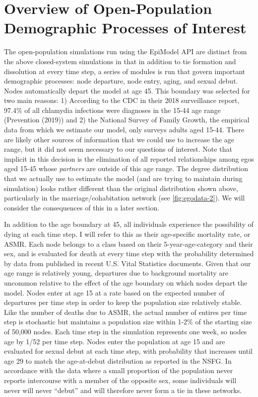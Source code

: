\documentclass [11pt, proquest] {uwthesis}[2015/03/03]
\begin{document}
\hypertarget{overview-of-open-population-demographic-processes-of-interest}{%
\section{Overview of Open-Population Demographic Processes of Interest}\label{overview-of-open-population-demographic-processes-of-interest}}

The open-population simulations run using the EpiModel API are distinct from the above closed-system simulations in that in addition to tie formation and dissolution at every time step, a series of modules is run that govern important demographic processes: node departure, node entry, aging, and sexual debut. Nodes automatically depart the model at age 45. This boundary was selected for two main reasons: 1) According to the CDC in their 2018 surveillance report, 97.4\% of all chlamydia infections were diagnoses in the 15-44 age range (Prevention (2019)) and 2) the National Survey of Family Growth, the empirical data from which we estimate our model, only surveys adults aged 15-44. There are likely other sources of information that we could use to increase the age range, but it did not seem necessary to our questions of interest. Note that implicit in this decision is the elimination of all reported relationships among egos aged 15-45 whose \emph{partners} are outside of this age range. The degree distribution that we actually use to estimate the model (and are trying to maintain during simulation) looks rather different than the original distribution shown above, particularly in the marriage/cohabitation network (see \ref{fig:egodata-2}). We will consider the consequences of this in a later section.

In addition to the age boundary at 45, all individuals experience the possibility of dying at each time step. I will refer to this as their age-specific mortality rate, or ASMR. Each node belongs to a class based on their 5-year-age-category and their sex, and is evaluated for death at every time step with the probability determined by data from published in recent U.S. Vital Statistics documents. Given that our age range is relatively young, departures due to background mortality are uncommon relative to the effect of the age boundary on which nodes depart the model. Nodes enter at age 15 at a rate based on the expected number of departures per time step in order to keep the population size relatively stable. Like the number of deaths due to ASMR, the actual number of entires per time step is stochastic but maintains a population size within 1-2\% of the starting size of 50,000 nodes. Each time step in the simulation represents one week, so nodes age by 1/52 per time step. Nodes enter the population at age 15 and are evaluated for sexual debut at each time step, with probability that increases until age 29 to match the age-at-debut distribution as reported in the NSFG. In accordance with the data where a small proportion of the population never reports intercourse with a member of the opposite sex, some individuals will never will never ``debut'' and will therefore never form a tie in these networks.
\end{document}
